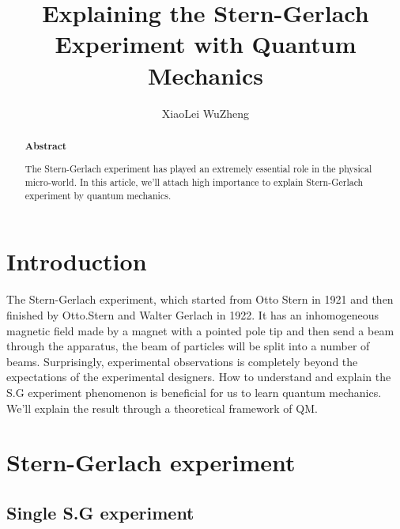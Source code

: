 \documentclass{article}
\author{XiaoLei WuZheng}
\title{Explaining the Stern-Gerlach Experiment with Quantum Mechanics}
\begin{document}
 
\maketitle 
\vspace{8pt} 
\renewcommand{\abstractname}{\huge \quad }
\begin{abstract} 
\centerline{\large\textbf{Abstract}}
\normalsize
{The Stern-Gerlach experiment has played an extremely essential role in the physical micro-world. In this article, we’ll attach high importance to explain Stern-Gerlach experiment by quantum mechanics. }
\noindent 
\end{abstract}


\section{Introduction}
 \begin{center}
 \normalsize
 {The Stern-Gerlach experiment, which started from Otto Stern in 1921 and then finished by Otto.Stern and Walter Gerlach in 1922. It has an inhomogeneous magnetic field made by a magnet with a pointed pole tip and then send a beam through the apparatus, the beam of particles will be split into a number of beams. Surprisingly, experimental observations is completely beyond the expectations of the experimental designers. How to understand and explain the S.G experiment phenomenon is beneficial for us to learn quantum mechanics. We’ll explain the result through a theoretical framework of QM.}
 \justifying
 \end{center}
 
\section{Stern-Gerlach experiment}
 \subsection{Single S.G experiment}
\end{document}

